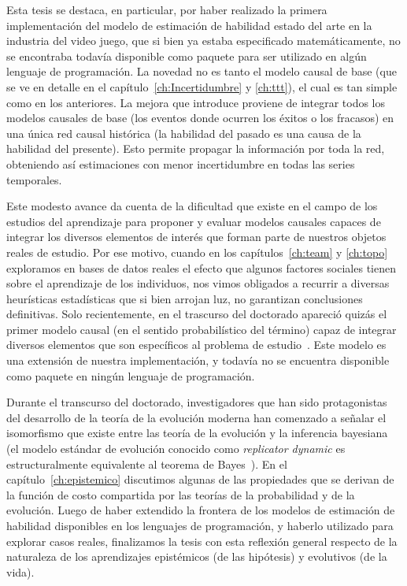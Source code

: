 \documentclass[a4paper,11pt]{book}
\theoremstyle{definition}
\begin{document}

Esta tesis se destaca, en particular, por haber realizado la primera implementaci\'on del modelo de estimaci\'on de habilidad estado del arte en la industria del video juego, que si bien ya estaba especificado matem\'aticamente, no se encontraba todav\'ia disponible como paquete para ser utilizado en alg\'un lenguaje de programaci\'on.
%
La novedad no es tanto el modelo causal de base (que se ve en detalle en el cap\'itulo~\ref{ch:Incertidumbre} y \ref{ch:ttt}), el cual es tan simple como en los anteriores.
%
La mejora que introduce proviene de integrar todos los modelos causales de base (los eventos donde ocurren los \'exitos o los fracasos) en una \'unica red causal hist\'orica (la habilidad del pasado es una causa de la habilidad del presente).
%
Esto permite propagar la informaci\'on por toda la red, obteniendo as\'i estimaciones con menor incertidumbre en todas las series temporales.


Este modesto avance da cuenta de la dificultad que existe en el campo de los estudios del aprendizaje para proponer y evaluar modelos causales capaces de integrar los diversos elementos de inter\'es que forman parte de nuestros objetos reales de estudio.
%
Por ese motivo, cuando en los cap\'itulos~\ref{ch:team} y \ref{ch:topo} exploramos en bases de datos reales el efecto que algunos factores sociales tienen sobre el aprendizaje de los individuos, nos vimos obligados a recurrir a diversas heur\'isticas estad\'isticas que si bien arrojan luz, no garantizan conclusiones definitivas.
%
Solo recientemente, en el trascurso del doctorado apareci\'o quiz\'as el primer modelo causal (en el sentido probabil\'istico del t\'ermino) capaz de integrar diversos elementos que son espec\'ificos al problema de estudio~\cite{minka2018-trueskill2}.
%
Este modelo es una extensi\'on de nuestra implementaci\'on, y todav\'ia no se encuentra disponible como paquete en ning\'un lenguaje de programaci\'on.


Durante el transcurso del doctorado, investigadores que han sido protagonistas del desarrollo de la teor\'ia de la evoluci\'on moderna han comenzado a se\~nalar el isomorfismo que existe entre las teor\'ia de la evoluci\'on y la inferencia bayesiana~\cite{czegel2019-bayesianEvolution, czegel2022-bayesDarwin} (el modelo est\'andar de evoluci\'on conocido como \emph{replicator dynamic} \cite{taylor1978-replicatorDynamic} es estructuralmente equivalente al teorema de Bayes~\cite{harper2009-replicatorAsInference,shalizi2009-replicatorAsInference}).
%
En el cap\'itulo~\ref{ch:epistemico} discutimos algunas de las propiedades que se derivan de la funci\'on de costo compartida por las teor\'ias de la probabilidad y de la evoluci\'on.
%
Luego de haber extendido la frontera de los modelos de estimaci\'on de habilidad disponibles en los lenguajes de programaci\'on, y haberlo utilizado para explorar casos reales, finalizamos la tesis con esta reflexi\'on general respecto de la naturaleza de los aprendizajes epist\'emicos (de las hip\'otesis) y evolutivos (de la vida).
\end{document}
